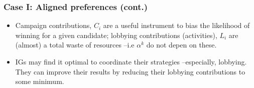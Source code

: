 \documentclass[handout,final,xcolor=dvipsnames]{beamer}
\begin{document}
    \begin{frame}\frametitle{Case I: Aligned preferences (cont.)}
  \begin{itemize}\itemsep 10pt
  \item Campaign contributions, $C_i$ are a useful instrument to bias
    the likelihood of winning for a given candidate; lobbying
    contributions (activities), $L_i$ are (almost) a total waste of
    resources --i.e $\alpha^k$ do not depen on these. 
    \item IGs may find it optimal to coordinate their strategies
      --especially, lobbying. They can improve their results by
      reducing their lobbying contributions to some minimum.
          \end{itemize}
  \end{frame}





\end{document}

